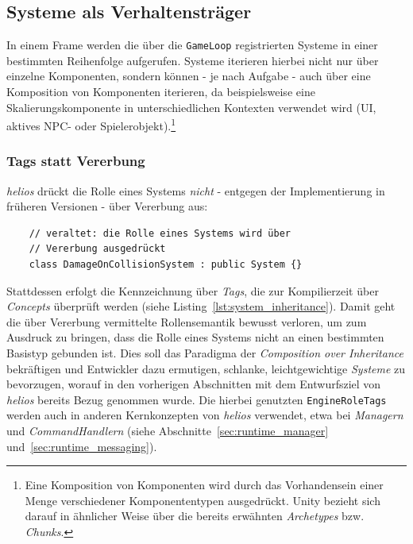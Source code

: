 \subsection{Systeme als Verhaltensträger}\label{sec:systems}

In einem Frame werden die über die \texttt{GameLoop} registrierten Systeme in einer bestimmten Reihenfolge aufgerufen.
Systeme iterieren hierbei nicht nur über einzelne Komponenten, sondern können - je nach Aufgabe - auch über eine Komposition von Komponenten iterieren, da beispielsweise eine Skalierungskomponente in unterschiedlichen Kontexten verwendet wird (UI, aktives NPC- oder Spielerobjekt).\footnote{
    Eine Komposition von Komponenten wird durch das Vorhandensein einer Menge verschiedener Komponententypen ausgedrückt.
    Unity bezieht sich darauf in ähnlicher Weise über die bereits erwähnten \textit{Archetypes} bzw. \textit{Chunks}.
}

\subsubsection{Tags statt Vererbung}

\textit{helios} drückt die Rolle eines Systems \textit{nicht} - entgegen der Implementierung in früheren Versionen - über Vererbung aus:

\begin{verbatim}
    // veraltet: die Rolle eines Systems wird über
    // Vererbung ausgedrückt
    class DamageOnCollisionSystem : public System {}
\end{verbatim}

\noindent
Stattdessen erfolgt die Kennzeichnung über \textit{Tags}, die zur Kompilierzeit über \textit{Concepts} überprüft werden (siehe Listing~\ref{lst:system_inheritance}).
Damit geht die über Vererbung vermittelte Rollensemantik bewusst verloren, um zum Ausdruck zu bringen, dass die Rolle eines Systems nicht an einen bestimmten Basistyp gebunden ist.
Dies soll das Paradigma der \textit{Composition over Inheritance} bekräftigen und Entwickler dazu ermutigen, schlanke, leichtgewichtige \textit{Systeme} zu bevorzugen, worauf in den vorherigen Abschnitten mit dem Entwurfsziel von \textit{helios} bereits Bezug genommen wurde.
Die hierbei genutzten \texttt{EngineRoleTags} werden auch in anderen Kernkonzepten von \textit{helios} verwendet, etwa bei \textit{Managern} und \textit{CommandHandlern} (siehe Abschnitte~\ref{sec:runtime_manager} und~\ref{sec:runtime_messaging}).

